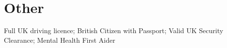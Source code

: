 \section{Other}

Full UK driving licence; British Citizen with Passport; Valid UK Security Clearance; Mental Health First Aider

    
    
    

\sectionsep